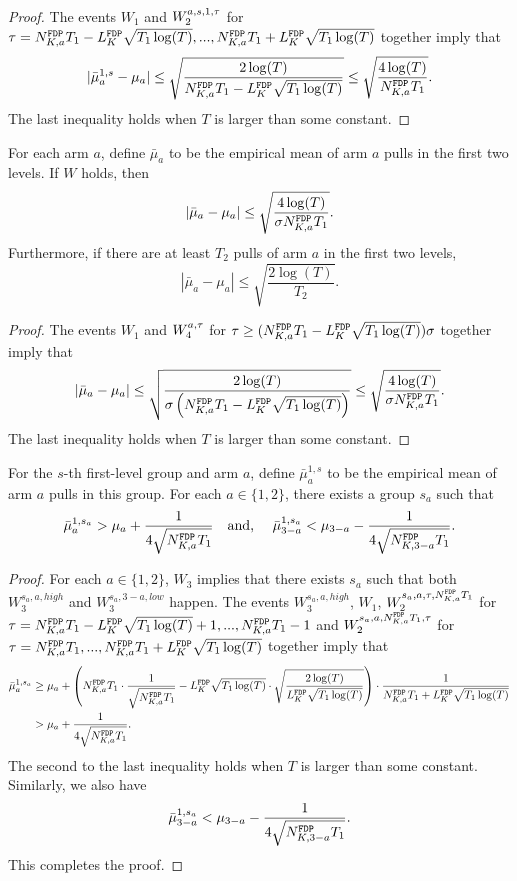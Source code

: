 \begin{proof}
  The events $W_1$ and $W_2^{a,s,1,\z}$ for
  $\z = \fdpN T_1- \GdT \sqrt{T_1\log(T)},...,\fdpN T_1 + \GdT
  \sqrt{T_1\log(T)}$ together imply that
\[
|\bar{\mu}_a^{1,s} - \mu_a| \leq \sqrt{\frac{2\log(T)}{\fdpN T_1- \GdT \sqrt{T_1\log(T)}}} \leq \sqrt{\frac{4\log(T)}{\fdpN T_1}}.
\]
The last inequality holds when $T$ is larger than some constant.
\end{proof}


\begin{lemma}
  For each arm $a$, define $\bar{\mu}_a$ to be the empirical mean of
  arm $a$ pulls in the first two levels. If $W$ holds, then
  \[
    |\bar{\mu}_a - \mu_a| \leq \sqrt{\frac{4\log(T)}{\NG \fdpN T_1}} .
  \]
Furthermore, if there are at least $T_2$ pulls of arm $a$ in the first two levels,
\[
|\bar{\mu}_a-\mu_a| \leq \sqrt{\frac{2\log(T)}{T_2}}.
\]
\end{lemma}

\begin{proof}
The events $W_1$ and $W_4^{a,\z}$ for $\z \geq  (\fdpN T_1- \GdT \sqrt{T_1\log(T)})\NG$ together imply that
  \[
    |\bar{\mu}_a - \mu_a| \leq \sqrt{\frac{2\log(T)}{\NG\left(\fdpN T_1- \GdT \sqrt{T_1\log(T)}\right)}} \leq \sqrt{\frac{4\log(T)}{\NG \fdpN T_1}} .
\]
The last inequality holds when $T$ is larger than some constant.
\end{proof}


\begin{lemma}\label{lem:luck}
  For the $s$-th first-level group and arm $a$, define
  $\bar{\mu}_a^{1,s}$ to be the empirical mean of arm $a$ pulls in
  this group. For each $a \in \{1,2\}$, there exists a group $s_a$
  such that
\[
\bar{\mu}_a ^{1,s_a} > \mu_a + \frac{1}{4\sqrt{\fdpN T_1}} \quad \mbox{and, } \quad
\bar{\mu}_{3-a} ^{1,s_a} < \mu_{3-a}   - \frac{1}{4\sqrt{\fdpN[3-a] T_1}}.
\]
\end{lemma}




\begin{proof}%
  For each $a \in \{1,2\}$, $W_3$ implies that there exists $s_a$ such
  that both $W_3^{s_a,a,high}$ and $W_3^{s_a,3-a,low}$ happen.  The
  events $W_3^{s_a,a,high}$, $W_1$, $W_2^{s_a,a,\z, \fdpN T_1}$
  for $\z = \fdpN T_1- \GdT \sqrt{T_1\log(T)}+1, ...,\fdpN T_1-1$ and
  $W_2^{s_a,a,\fdpN T_1,\z}$ for
  $\z= \fdpN T_1,...,\fdpN T_1+ \GdT \sqrt{T_1\log(T)}$ together imply that
\begin{align*}
\bar{\mu}_a ^{1,s_a} &\geq \mu_a + \left(\fdpN T_1 \cdot \frac{1}{\sqrt{\fdpN T_1}} - \GdT \sqrt{T_1\log(T)} \cdot \sqrt{\frac{2\log(T)}{ \GdT \sqrt{T_1\log(T)}}} \right) \cdot \frac{1}{\fdpN T_1+ \GdT \sqrt{T_1\log(T)}} \\
&> \mu_a + \frac{1}{4\sqrt{\fdpN T_1}}.
\end{align*}
The second to the last inequality holds when $T$ is larger than some constant.
Similarly, we also have
\[
\bar{\mu}_{3-a} ^{1,s_a} < \mu_{3-a}   - \frac{1}{4\sqrt{\fdpN[3-a] T_1}}.
\]
This completes the proof.
\end{proof}


